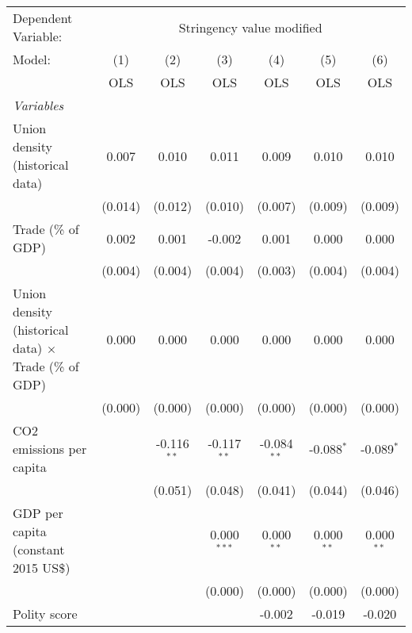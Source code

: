
\begingroup
\centering
\begin{tabular}{lcccccc}
   \toprule
   Dependent Variable: & \multicolumn{6}{c}{Stringency value modified}\\
   Model:                                                       & (1)     & (2)           & (3)           & (4)           & (5)          & (6)\\  
                                                                &  OLS    & OLS           & OLS           & OLS           & OLS          & OLS\\  
   \midrule
   \emph{Variables}\\
   Union density (historical data)                              & 0.007   & 0.010         & 0.011         & 0.009         & 0.010        & 0.010\\   
                                                                & (0.014) & (0.012)       & (0.010)       & (0.007)       & (0.009)      & (0.009)\\   
   Trade (\% of GDP)                                            & 0.002   & 0.001         & -0.002        & 0.001         & 0.000        & 0.000\\   
                                                                & (0.004) & (0.004)       & (0.004)       & (0.003)       & (0.004)      & (0.004)\\   
   Union density (historical data) $\times$ Trade (\% of GDP)   & 0.000   & 0.000         & 0.000         & 0.000         & 0.000        & 0.000\\   
                                                                & (0.000) & (0.000)       & (0.000)       & (0.000)       & (0.000)      & (0.000)\\   
   CO2 emissions per capita                                     &         & -0.116$^{**}$ & -0.117$^{**}$ & -0.084$^{**}$ & -0.088$^{*}$ & -0.089$^{*}$\\   
                                                                &         & (0.051)       & (0.048)       & (0.041)       & (0.044)      & (0.046)\\   
   GDP per capita (constant 2015 US\$)                          &         &               & 0.000$^{***}$ & 0.000$^{**}$  & 0.000$^{**}$ & 0.000$^{**}$\\   
                                                                &         &               & (0.000)       & (0.000)       & (0.000)      & (0.000)\\   
   Polity score                                                 &         &               &               & -0.002        & -0.019       & -0.020\\   

\end{tabular}
